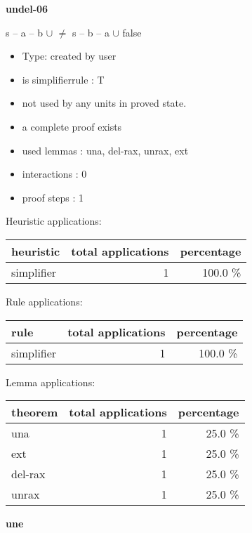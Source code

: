 \documentclass[a4paper]{article}
\begin{document}
{\LARGE\bf undel-06}\label{lemma-undel-06}

\medskip

 \Fol s -- a -- b $\cup$  $\neq$ s -- b -- a $\cup$  \Equiv false

\begin{itemize}

\item Type: created by user

\item is simplifierrule : T
\item not used by any units in proved state.
\item       a complete proof exists
\item       used lemmas  : una, del-rax, unrax, ext
\item       interactions : 0
\item       proof steps  : 1
\end{itemize}

\medskip


Heuristic applications:

\begin{supertabular}{l|r|r}
heuristic	& total applications & percentage \\ \hline
simplifier & 1 & 100.0 \% \\

\end{supertabular}

Rule applications:

\begin{supertabular}{l|r|r}
rule	        & total applications & percentage \\ \hline
simplifier & 1 & 100.0 \% \\

\end{supertabular}

Lemma applications:

\begin{supertabular}{l|r|r}
theorem	        & total applications & percentage \\ \hline
una & 1 & 25.0 \% \\
ext & 1 & 25.0 \% \\
del-rax & 1 & 25.0 \% \\
unrax & 1 & 25.0 \% \\

\end{supertabular}
\pagebreak

{\LARGE\bf une}\label{lemma-une}
\end{document}
